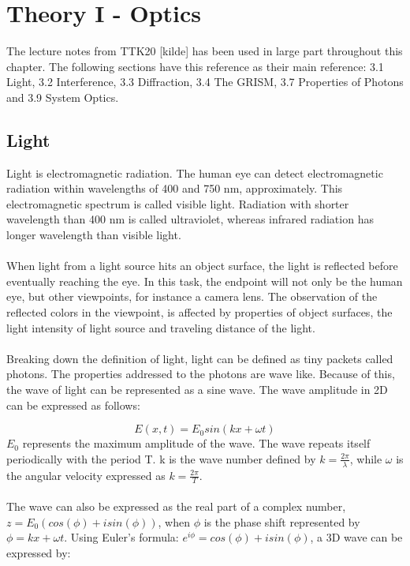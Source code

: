 \chapter{Theory I - Optics}
\label{chap:theory1}

The lecture notes from TTK20 [kilde] has been used in large part throughout this chapter. The following sections have this reference as their main reference: 3.1 Light, 3.2 Interference, 3.3 Diffraction, 3.4 The GRISM, 3.7 Properties of Photons and 3.9  System Optics. 

\section{Light} \label{sec:light}
Light is electromagnetic radiation. The human eye can detect electromagnetic radiation within wavelengths of 400 and 750 nm, approximately. This electromagnetic spectrum is called visible light. Radiation with shorter wavelength than 400 nm is called ultraviolet, whereas infrared radiation has longer wavelength than visible light.
\\\\
When light from a light source hits an object surface, the light is reflected before eventually reaching the eye. In this task, the endpoint will not only be the human eye, but other viewpoints, for instance a camera lens. The observation of the reflected colors in the viewpoint, is affected by properties of object surfaces, the light intensity of light source and traveling distance of the light.
\\\\
Breaking down the definition of light, light can be defined as tiny packets called photons. The properties addressed to the photons are wave like. Because of this, the wave of light can be represented as a sine wave. The wave amplitude in 2D can be expressed as follows: 

\begin{equation}
    E(x,t) = E_0 sin(kx+\omega t)
    \label{eq:aml2d}
\end{equation}
$E_0$ represents the maximum amplitude of the wave. The wave repeats itself periodically with the period T. k is the wave number defined by $k= \frac{2 \pi}{\lambda}$, while $\omega$ is the angular velocity expressed as $k= \frac{2 \pi}{T}$.
\\\\
The wave can also be expressed as the real part of a complex number, $z = E_0(cos(\phi) + i sin(\phi))$, when $\phi$ is the phase shift represented by $\phi = kx + \omega t$. Using Euler's formula: $e^{i \phi} = cos(\phi) + i sin(\phi)$, a 3D wave can be expressed by: 

